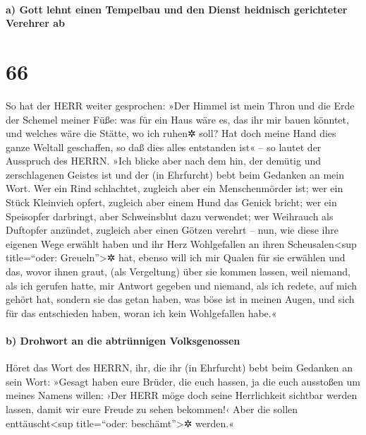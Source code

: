 \hypertarget{a-gott-lehnt-einen-tempelbau-und-den-dienst-heidnisch-gerichteter-verehrer-ab}{%
\paragraph{a) Gott lehnt einen Tempelbau und den Dienst heidnisch
gerichteter Verehrer
ab}\label{a-gott-lehnt-einen-tempelbau-und-den-dienst-heidnisch-gerichteter-verehrer-ab}}

\hypertarget{section-65}{%
\section{66}\label{section-65}}

So hat der HERR weiter gesprochen: »Der Himmel ist mein
Thron und die Erde der Schemel meiner Füße: was für ein Haus wäre es,
das ihr mir bauen könntet, und welches wäre die Stätte, wo ich ruhen✲
soll? Hat doch meine Hand dies ganze Weltall geschaffen,
so daß dies alles entstanden ist« -- so lautet der Ausspruch des HERRN.
»Ich blicke aber nach dem hin, der demütig und zerschlagenen Geistes ist
und der (in Ehrfurcht) bebt beim Gedanken an mein Wort.
Wer ein Rind schlachtet, zugleich aber ein Menschenmörder
ist; wer ein Stück Kleinvieh opfert, zugleich aber einem Hund das Genick
bricht; wer ein Speisopfer darbringt, aber Schweinsblut dazu verwendet;
wer Weihrauch als Duftopfer anzündet, zugleich aber einen Götzen verehrt
-- nun, wie diese ihre eigenen Wege erwählt haben und ihr Herz
Wohlgefallen an ihren Scheusalen\textless sup title=``oder:
Greueln''\textgreater✲ hat, ebenso will ich mir Qualen für
sie erwählen und das, wovor ihnen graut, (als Vergeltung) über sie
kommen lassen, weil niemand, als ich gerufen hatte, mir Antwort gegeben
und niemand, als ich redete, auf mich gehört hat, sondern sie das getan
haben, was böse ist in meinen Augen, und sich für das entschieden haben,
woran ich kein Wohlgefallen habe.«

\hypertarget{b-drohwort-an-die-abtruxfcnnigen-volksgenossen}{%
\paragraph{b) Drohwort an die abtrünnigen
Volksgenossen}\label{b-drohwort-an-die-abtruxfcnnigen-volksgenossen}}

Höret das Wort des HERRN, ihr, die ihr (in Ehrfurcht) bebt
beim Gedanken an sein Wort: »Gesagt haben eure Brüder, die euch hassen,
ja die euch ausstoßen um meines Namens willen: ›Der HERR möge doch seine
Herrlichkeit sichtbar werden lassen, damit wir eure Freude zu sehen
bekommen!‹ Aber die sollen enttäuscht\textless sup title=``oder:
beschämt''\textgreater✲ werden.«

